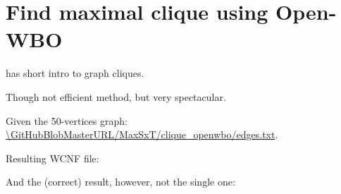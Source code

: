 \section{Find maximal clique using Open-WBO}

\MathForProg has short intro to graph cliques.

\renewcommand{\CURPATH}{MaxSxT/clique_openwbo}

Though not efficient method, but very spectacular.

Given the 50-vertices graph: \url{\GitHubBlobMasterURL/\CURPATH/edges.txt}.



Resulting WCNF file:



And the (correct) result, however, not the single one:



